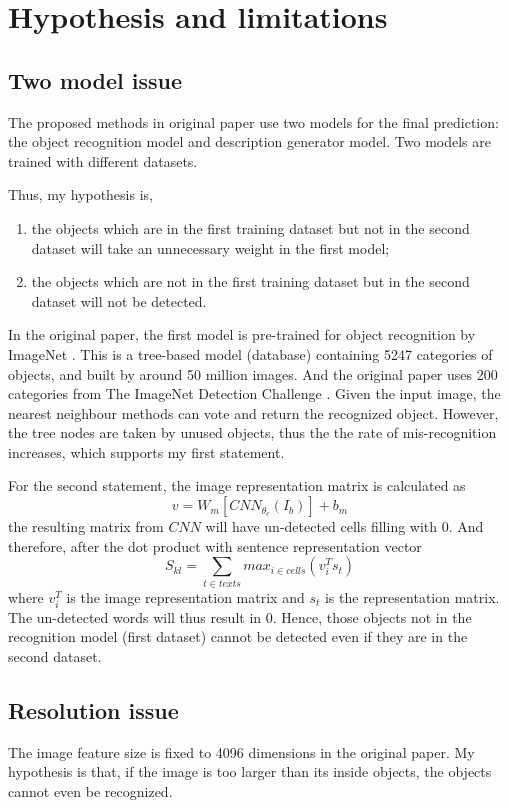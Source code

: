 \documentclass[10pt,twocolumn,letterpaper]{article}
\begin{document}
\section{Hypothesis and limitations} \label{sec:hl}
\subsection{Two model issue}
The proposed methods in original paper use two models for the final prediction:
the object recognition model and description generator model.
Two models are trained with different datasets.

Thus, my hypothesis is,
\begin{enumerate}
    \item the objects which are in the first training dataset but not in the second dataset
          will take an unnecessary weight in the first model;
    \item the objects which are not in the first training dataset but in the second dataset
          will not be detected.
\end{enumerate}

In the original paper, the first model is pre-trained for object recognition by ImageNet \cite{imagenet}.
This is a tree-based model (database) containing 5247 categories of objects, and built by around 50 million images.
And the original paper uses 200 categories from The ImageNet Detection Challenge \cite{inch}.
Given the input image, the nearest neighbour methods can vote and return the recognized object.
However, the tree nodes are taken by unused objects, thus the the rate of mis-recognition increases, which supports my first statement.

For the second statement, the image representation matrix is calculated as
$$v = W_{m} \left [ CNN_{\theta_{c}}(I_{b}) \right ] + b_{m}$$
the resulting matrix from $CNN$ will have un-detected cells filling with $0$.
And therefore, after the dot product with sentence representation vector
$$S_{kl} = \sum_{t \in texts} max_{i \in cells}(v_{i}^{T}s_{t})$$
where $v_{i}^{T}$ is the image representation matrix and $s_{t}$ is the representation matrix.
The un-detected words will thus result in $0$.
Hence, those objects not in the recognition model (first dataset) cannot be detected even if they are in the second dataset.


\subsection{Resolution issue}
The image feature size is fixed to 4096 dimensions in the original paper.
My hypothesis is that, if the image is too larger than its inside objects, the objects cannot even be recognized.
\end{document}
